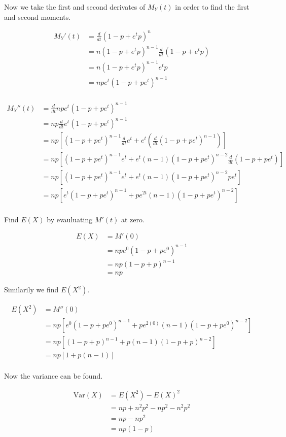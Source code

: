\documentclass{tufte-book}
\newcommand{\Var}{\mathrm{Var}}
\theoremstyle{mytheoremstyle}
\theoremstyle{mylemstyle}
\theoremstyle{mydefstyle}
\begin{document}
\begin{enumerate}
Now we take the first and second derivates of $M_Y(t)$ in order to find the first and second moments.

\begin{align*}
M_Y'(t) &= \frac{d}{dt}(1-p+e^tp)^n\\
&= n(1-p+e^tp)^{n-1} \frac{d}{dt}(1-p+e^tp)\\
&= n(1-p+e^tp)^{n-1} e^{t}p\\
&= npe^t(1-p+pe^t)^{n-1}\\
\end{align*}

\begin{align*}
M_Y''(t) &= \frac{d}{dt}npe^t(1-p+pe^t)^{n-1}\\
&= np\frac{d}{dt}e^t(1-p+pe^t)^{n-1}\\
&= np[(1-p+pe^t)^{n-1} \frac{d}{dt}e^t + e^t(\frac{d}{dt}(1-p+pe^t)^{n-1})]\\
&= np[(1-p+pe^t)^{n-1}e^t + e^t(n-1)(1-p+pe^t)^{n-2}\frac{d}{dt}(1-p+pe^t)]\\
&= np[(1-p+pe^t)^{n-1}e^t + e^t(n-1)(1-p+pe^t)^{n-2}pe^t]\\
&= np[e^t(1-p+pe^t)^{n-1}+ pe^{2t}(n-1)(1-p+pe^t)^{n-2}]\\
\end{align*}

Find $E(X)$ by evauluating $M'(t)$ at zero.

\begin{align*}
E(X) &= M'(0)\\
&= npe^0 (1-p+pe^0)^{n-1}\\
&= np(1-p+p)^{n-1}\\
&= np
\end{align*}

Similarily we find $E(X^2)$.

\begin{align*}
E(X^2) &= M''(0)\\
&= np[e^0(1-p+pe^0)^{n-1}+ pe^{2(0)}(n-1)(1-p+pe^0)^{n-2}]\\
&= np[(1-p+p)^{n-1} + p(n-1)(1-p+p)^{n-2}]\\
&= np[1 + p(n-1)]\\
\end{align*}

Now the variance can be found.

\begin{align*}
\Var(X) &= E(X^2) - E(X)^2\\
&= np + n^2p^2 - np^2 - n^2p^2\\
&= np - np^2\\
&= np(1-p)\\
\end{align*}
\end{enumerate}
\end{document}
